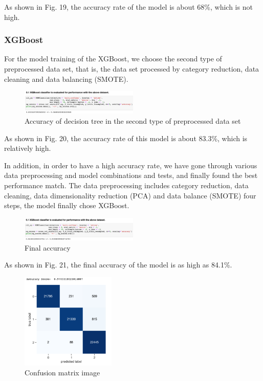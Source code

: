 \documentclass[conference]{IEEEtran}
\begin{document}
As shown in Fig. 19, the accuracy rate of the model is about 68\%, which is not high.

\subsubsection{XGBoost}

For the model training of the XGBoost, we choose the second type of preprocessed data set, that is, the data set processed by category reduction, data cleaning and data balancing (SMOTE).

\begin{figure}[H]
\centerline{\includegraphics[width=0.5\textwidth]{19.pic.jpg}}
\caption{Accuracy of decision tree in the second type of preprocessed data set}
\end{figure}

As shown in Fig. 20, the accuracy rate of this model is about 83.3\%, which is relatively high.

In addition, in order to have a high accuracy rate, we have gone through various data preprocessing and model combinations and tests, and finally found the best performance match. The data preprocessing includes category reduction, data cleaning, data dimensionality reduction (PCA)
and data balance (SMOTE) four steps, the model finally chose XGBoost.

\begin{figure}[H]
\centerline{\includegraphics[width=0.5\textwidth]{20.pic.jpg}}
\caption{Final accuracy}
\end{figure}
    
As shown in Fig. 21, the final accuracy of the model is as high as 84.1\%.

\begin{figure}[H]
\centerline{\includegraphics[width=0.4\textwidth]{21.pic.jpg}}
\caption{Confusion matrix image}
\end{figure}
    
\end{document}
